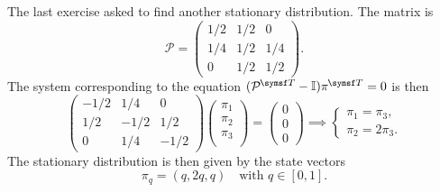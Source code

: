 The last exercise asked to find another stationary distribution. The matrix is
\begin{equation}
    \mathcal{P} =
    \begin{pmatrix}
        1/2 & 1/2 &  0  \\
        1/4 & 1/2 & 1/4 \\
         0  & 1/2 & 1/2
    \end{pmatrix}.
\end{equation}
The system corresponding to the equation $(\mathcal{P}\tran - \I) \pi\tran = 0$
is then
\begin{equation}
    \begin{pmatrix}
        -1/2 & 1/4 & 0 \\
        1/2 & -1/2 & 1/2 \\
        0 & 1/4 & -1/2
    \end{pmatrix}
    \begin{pmatrix}
        \pi_1 \\ \pi_2 \\ \pi_3 \\
    \end{pmatrix}
    =
    \begin{pmatrix}
        0 \\ 0 \\ 0
    \end{pmatrix}
    \implies
    \begin{cases}
        \pi_1 = \pi_3, \\
        \pi_2 = 2\pi_3.
    \end{cases}
\end{equation}
The stationary distribution is then given by the state vectors
\begin{equation}
    \pi_q = (q, 2q, q) \quad\text{with } q \in [0, 1].
\end{equation}

